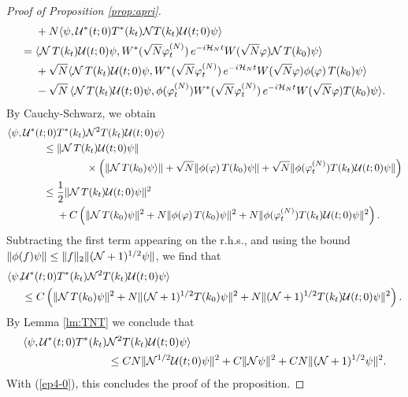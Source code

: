 \documentclass[11pt,a4paper]{article}
\newcommand{\cU}{{\cal U}}
\newcommand{\cH}{{\cal H}}
\newcommand{\cN}{{\cal N}}
\begin{document}
\begin{proof}[Proof of Proposition \ref{prop:apri}]
\begin{equation}
\begin{split}
 &+ N  \langle \psi, \cU^* (t;0)  T^* (k_t) \cN T (k_t) \cU (t;0) \psi \rangle \\
 = \; &  \langle \cN \, T (k_t) \cU (t;0) \psi,  W^* (\sqrt{N} \varphi_t^{(N)}) \,  e^{-i \cH_N t} W (\sqrt{N} \varphi)  \cN \, T (k_0) \psi \rangle \\ &+\sqrt{N} \langle \cN \, T (k_t) \cU (t;0) \psi,  W^* (\sqrt{N} \varphi_t^{(N)}) \,  e^{-i \cH_N t} W (\sqrt{N} \varphi)  \phi (\varphi) \, T (k_0) \psi \rangle \\
 &-\sqrt{N} \, \langle \cN \, T (k_t) \cU (t;0) \psi,  \phi (\varphi_t^{(N)})  W^* (\sqrt{N} \varphi_t^{(N)}) \, e^{-i \cH_N t}  W (\sqrt{N} \varphi) T (k_0) \psi \rangle.
\end{split} \end{equation}
By Cauchy-Schwarz, we obtain 
\[ \begin{split} 
\langle \psi , \cU^* (t;0) &T^* (k_t) \cN^2  T(k_t) \cU (t;0) \psi \rangle \\ \leq \; & \| \cN \, T (k_t) \cU (t;0) \psi \|\\ & \hspace{1cm} \times  \left(  \| \cN \, T (k_0) \psi \rangle \| + \sqrt{N} \| \phi (\varphi) \, T (k_0) \psi \| + \sqrt{N} \|  \phi (\varphi_t^{(N)}) T (k_t) \cU (t;0)  \psi \| \right) \\ \leq \; & \frac{1}{2} \| \cN \, T (k_t) \cU (t;0) \psi \|^2 \\ &+ C \left( \|
\cN \, T (k_0) \psi \|^2 + N \| \phi (\varphi) \, T (k_0) \psi \|^2 + N \|  \phi (\varphi_t^{(N)}) T (k_t) \cU (t;0)  \psi \|^2 \right). 
\end{split} \]
Subtracting the first term appearing on the r.h.s., and using the bound $\| \phi (f) \psi \| \leq \| f \|_2 \| (\cN+1)^{1/2} \psi \|$, we find that
\[ \begin{split} \langle \psi , & \cU^* (t;0) T^* (k_t) \cN^2  T(k_t) \cU (t;0) \psi \rangle \\ & \leq C \left( \|
\cN \, T(k_0)  \psi \|^2 + N \| (\cN+1)^{1/2} T(k_0) \psi \|^2 + N \| (\cN+1)^{1/2} T(k_t) \cU (t;0)  \psi \|^2 \right).  \end{split} \]
By Lemma \ref{lm:TNT} we conclude that 
\[ \begin{split} \langle \psi , \cU^* (t;0) T^* (k_t)  \cN^2 &T (k_t) \cU (t;0) \psi \rangle \\ \leq \; &C N  \| \cN^{1/2}  \cU (t;0) \psi \|^2 + C \| \cN \psi \|^2 + CN \| (\cN+1)^{1/2} \psi \|^2 . \end{split} \]
With (\ref{ep4-0}), this concludes the proof of the proposition.
\end{proof}
\end{document}

